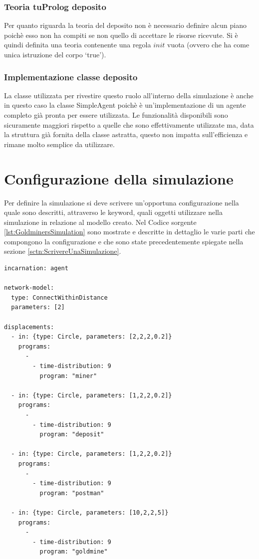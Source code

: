 \subsubsection{Teoria tuProlog deposito}
Per quanto riguarda la teoria del deposito non è necessario definire alcun piano poichè esso non ha compiti se non quello di accettare le risorse ricevute. Si è quindi definita una teoria contenente una regola $init$ vuota (ovvero che ha come unica istruzione del corpo `true').

\subsubsection{Implementazione classe deposito}
La classe utilizzata per rivestire questo ruolo all'interno della simulazione è anche in questo caso la classe SimpleAgent poichè è un'implementazione di un agente completo già pronta per essere utilizzata.
%
Le funzionalità disponibili sono sicuramente maggiori rispetto a quelle che sono effettivamente utilizzate ma, data la struttura già fornita della classe astratta, questo non impatta sull'efficienza e rimane molto semplice da utilizzare.

\section{Configurazione della simulazione}
Per definire la simulazione si deve scrivere un'opportuna configurazione nella quale sono descritti, attraverso le keyword, quali oggetti utilizzare nella simulazione in relazione al modello creato. Nel Codice sorgente \ref{lst:GoldminersSimulation} sono mostrate e descritte in dettaglio le varie parti che compongono la configurazione e che sono state precedentemente spiegate nella sezione \ref{sctn:ScrivereUnaSimulazione}.

\switchToProlog{}
\begin{lstlisting}[float,firstnumber=1,label={lst:GoldminersSimulation},caption={Configurazione simulazione Goldminers}]
incarnation: agent

network-model:
  type: ConnectWithinDistance
  parameters: [2]

displacements:
  - in: {type: Circle, parameters: [2,2,2,0.2]}
    programs:
      -
        - time-distribution: 9
          program: "miner"

  - in: {type: Circle, parameters: [1,2,2,0.2]}
    programs:
      -
        - time-distribution: 9
          program: "deposit"

  - in: {type: Circle, parameters: [1,2,2,0.2]}
    programs:
      -
        - time-distribution: 9
          program: "postman"

  - in: {type: Circle, parameters: [10,2,2,5]}
    programs:
      -
        - time-distribution: 9
          program: "goldmine"
\end{lstlisting}


